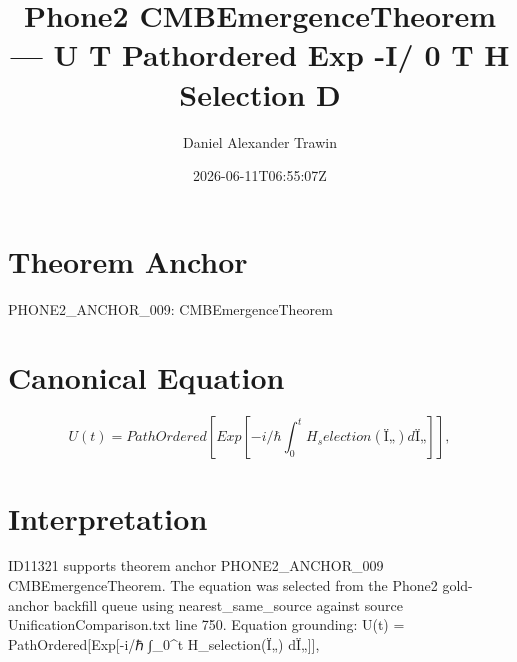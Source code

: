 \documentclass[11pt]{article}
\title{Phone2 CMBEmergenceTheorem — U T Pathordered Exp -I/ 0 T H Selection D}
\author{Daniel Alexander Trawin}
\date{2026-06-11T06:55:07Z}
\begin{document}
\maketitle
\section*{Theorem Anchor}
PHONE2_ANCHOR_009: CMBEmergenceTheorem
\section*{Canonical Equation}
\[
U(t) = PathOrdered[Exp[-i/ℏ ∫_0^t H_selection(Ï„) dÏ„]],
\]
\section*{Interpretation}
ID11321 supports theorem anchor PHONE2_ANCHOR_009 CMBEmergenceTheorem. The equation was selected from the Phone2 gold-anchor backfill queue using nearest_same_source against source UnificationComparison.txt line 750. Equation grounding: U(t) = PathOrdered[Exp[-i/ℏ ∫_0^t H_selection(Ï„) dÏ„]],
\end{document}
